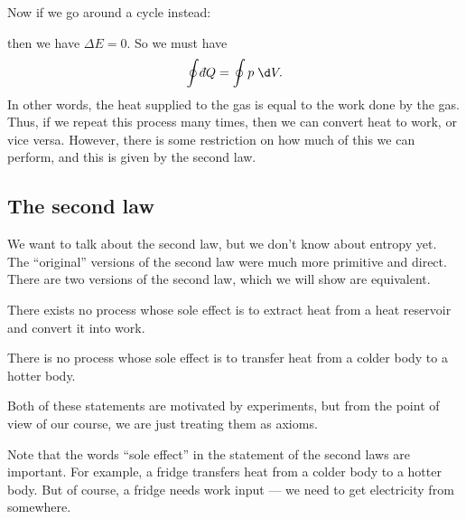\documentclass[a4paper]{article}
\def\di{{\mathchar'26\mkern-12mu d}}
\begin{document}
Now if we go around a cycle instead:
\begin{center}
\end{center}
then we have $\Delta E = 0$. So we must have
\[
  \oint \di Q = \oint p \;\d V.
\]
In other words, the heat supplied to the gas is equal to the work done by the gas. Thus, if we repeat this process many times, then we can convert heat to work, or vice versa. However, there is some restriction on how much of this we can perform, and this is given by the second law.

\subsection{The second law}
We want to talk about the second law, but we don't know about entropy yet. The ``original'' versions of the second law were much more primitive and direct. There are two versions of the second law, which we will show are equivalent.

\begin{law}
  There exists no process whose sole effect is to extract heat from a heat reservoir and convert it into work.
\end{law}

\begin{law}
  There is no process whose sole effect is to transfer heat from a colder body to a hotter body.
\end{law}
Both of these statements are motivated by experiments, but from the point of view of our course, we are just treating them as axioms.

Note that the words ``sole effect'' in the statement of the second laws are important. For example, a fridge transfers heat from a colder body to a hotter body. But of course, a fridge needs work input --- we need to get electricity from somewhere.
\end{document}

